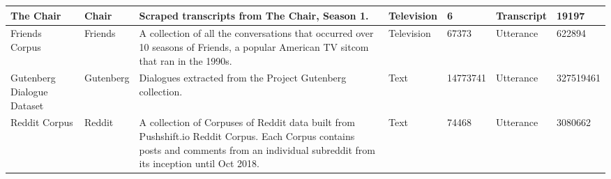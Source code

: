 \documentclass[10pt]{article}
\begin{document}
\begin{table}
\begin{tabular}{p{0.6in}|l|p{2.2in}|l|p{0.5in}|p{0.5in}|p{0.5in}}
        \midrule
        The Chair & Chair & Scraped transcripts from The Chair, Season 1. & Television & 6 & Transcript & 19197 \\
        \midrule
        Friends Corpus & Friends & A collection of all the conversations that occurred over 10 seasons of Friends, a popular American TV sitcom that ran in the 1990s. & Television & 67373 & Utterance & 622894 \\
        \midrule
        Gutenberg Dialogue Dataset & Gutenberg & Dialogues extracted from the Project Gutenberg collection. & Text & 14773741 & Utterance & 327519461 \\
        \midrule
        Reddit Corpus & Reddit & A collection of Corpuses of Reddit data built from Pushshift.io Reddit Corpus. Each Corpus contains posts and comments from an individual subreddit from its inception until Oct 2018. & Text & 74468 & Utterance & 3080662 \\
        \bottomrule
    \end{tabular}
\end{table}
\end{document}
